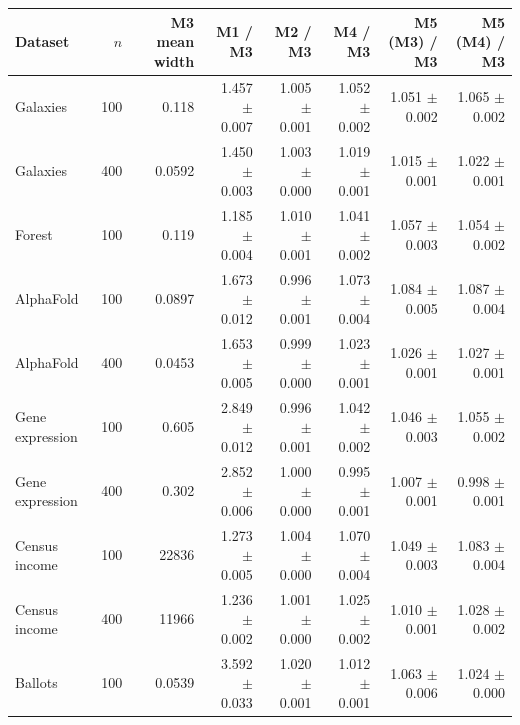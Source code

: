 \begin{tabular}{lrrrrrrr}
\toprule
Dataset & $n$ & M3 mean width & M1 / M3 & M2 / M3 & M4 / M3 & M5 (M3) / M3 & M5 (M4) / M3 \\
\midrule
Galaxies & 100 & 0.118 & 1.457 $\pm$ 0.007 & 1.005 $\pm$ 0.001 & 1.052 $\pm$ 0.002 & 1.051 $\pm$ 0.002 & 1.065 $\pm$ 0.002 \\
Galaxies & 400 & 0.0592 & 1.450 $\pm$ 0.003 & 1.003 $\pm$ 0.000 & 1.019 $\pm$ 0.001 & 1.015 $\pm$ 0.001 & 1.022 $\pm$ 0.001 \\
Forest & 100 & 0.119 & 1.185 $\pm$ 0.004 & 1.010 $\pm$ 0.001 & 1.041 $\pm$ 0.002 & 1.057 $\pm$ 0.003 & 1.054 $\pm$ 0.002 \\
AlphaFold & 100 & 0.0897 & 1.673 $\pm$ 0.012 & 0.996 $\pm$ 0.001 & 1.073 $\pm$ 0.004 & 1.084 $\pm$ 0.005 & 1.087 $\pm$ 0.004 \\
AlphaFold & 400 & 0.0453 & 1.653 $\pm$ 0.005 & 0.999 $\pm$ 0.000 & 1.023 $\pm$ 0.001 & 1.026 $\pm$ 0.001 & 1.027 $\pm$ 0.001 \\
Gene expression & 100 & 0.605 & 2.849 $\pm$ 0.012 & 0.996 $\pm$ 0.001 & 1.042 $\pm$ 0.002 & 1.046 $\pm$ 0.003 & 1.055 $\pm$ 0.002 \\
Gene expression & 400 & 0.302 & 2.852 $\pm$ 0.006 & 1.000 $\pm$ 0.000 & 0.995 $\pm$ 0.001 & 1.007 $\pm$ 0.001 & 0.998 $\pm$ 0.001 \\
Census income & 100 & 22836 & 1.273 $\pm$ 0.005 & 1.004 $\pm$ 0.000 & 1.070 $\pm$ 0.004 & 1.049 $\pm$ 0.003 & 1.083 $\pm$ 0.004 \\
Census income & 400 & 11966 & 1.236 $\pm$ 0.002 & 1.001 $\pm$ 0.000 & 1.025 $\pm$ 0.002 & 1.010 $\pm$ 0.001 & 1.028 $\pm$ 0.002 \\
Ballots & 100 & 0.0539 & 3.592 $\pm$ 0.033 & 1.020 $\pm$ 0.001 & 1.012 $\pm$ 0.001 & 1.063 $\pm$ 0.006 & 1.024 $\pm$ 0.000 \\
\bottomrule
\end{tabular}
